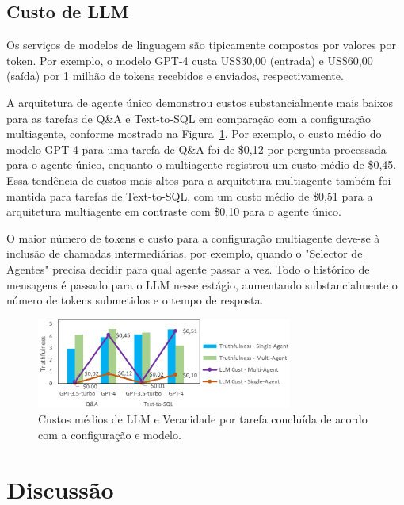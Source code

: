         \subsection{Custo de LLM}
        
            Os serviços de modelos de linguagem são tipicamente compostos por valores por token. Por exemplo, o modelo GPT-4 custa US\$30,00 (entrada) e US\$60,00 (saída) por 1 milhão de tokens recebidos e enviados, respectivamente.
            
            A arquitetura de agente único demonstrou custos substancialmente mais baixos para as tarefas de Q\&A e Text-to-SQL em comparação com a configuração multiagente, conforme mostrado na Figura~\ref{fig:truthfulness_vs_cost_vs_config_model}. Por exemplo, o custo médio do modelo GPT-4 \cite{OpenAI2023} para uma tarefa de Q\&A foi de \$0,12 por pergunta processada para o agente único, enquanto o multiagente registrou um custo médio de \$0,45. Essa tendência de custos mais altos para a arquitetura multiagente também foi mantida para tarefas de Text-to-SQL, com um custo médio de \$0,51 para a arquitetura multiagente em contraste com \$0,10 para o agente único.
            
            O maior número de tokens e custo para a configuração multiagente deve-se à inclusão de chamadas intermediárias, por exemplo, quando o "Selector de Agentes" precisa decidir para qual agente passar a vez. Todo o histórico de mensagens é passado para o LLM nesse estágio, aumentando substancialmente o número de tokens submetidos e o tempo de resposta.
            
            \begin{figure}[h]
                \centering              
                \includegraphics[width=0.75\textwidth]{images/truthfulness_vs_cost_vs_config_model.png}
                \caption{Custos médios de LLM e Veracidade por tarefa concluída de acordo com a configuração e modelo.}
                \label{fig:truthfulness_vs_cost_vs_config_model}
            \end{figure}
    
    
    \section{Discussão} 
        
